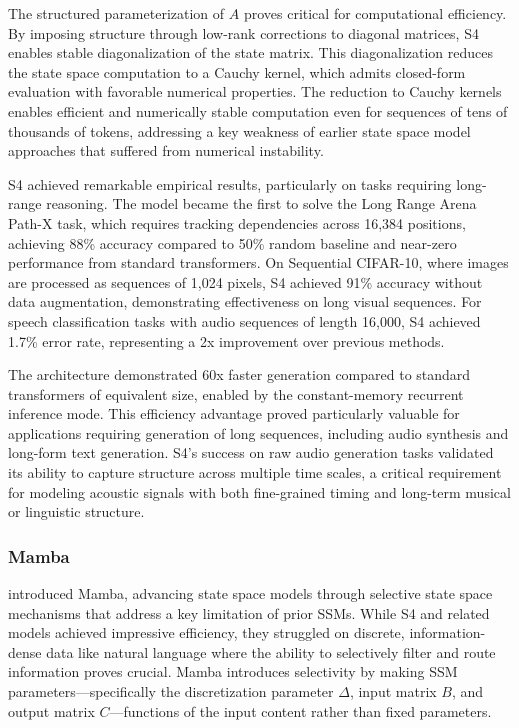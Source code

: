 \documentclass[11pt,letterpaper]{article}
\begin{document}
The structured parameterization of $A$ proves critical for computational efficiency. By imposing structure through low-rank corrections to diagonal matrices, S4 enables stable diagonalization of the state matrix. This diagonalization reduces the state space computation to a Cauchy kernel, which admits closed-form evaluation with favorable numerical properties. The reduction to Cauchy kernels enables efficient and numerically stable computation even for sequences of tens of thousands of tokens, addressing a key weakness of earlier state space model approaches that suffered from numerical instability.

S4 achieved remarkable empirical results, particularly on tasks requiring long-range reasoning. The model became the first to solve the Long Range Arena Path-X task, which requires tracking dependencies across 16,384 positions, achieving 88\% accuracy compared to 50\% random baseline and near-zero performance from standard transformers. On Sequential CIFAR-10, where images are processed as sequences of 1,024 pixels, S4 achieved 91\% accuracy without data augmentation, demonstrating effectiveness on long visual sequences. For speech classification tasks with audio sequences of length 16,000, S4 achieved 1.7\% error rate, representing a 2x improvement over previous methods.

The architecture demonstrated 60x faster generation compared to standard transformers of equivalent size, enabled by the constant-memory recurrent inference mode. This efficiency advantage proved particularly valuable for applications requiring generation of long sequences, including audio synthesis and long-form text generation. S4's success on raw audio generation tasks validated its ability to capture structure across multiple time scales, a critical requirement for modeling acoustic signals with both fine-grained timing and long-term musical or linguistic structure.

\subsubsection{Mamba}

\cite{gu2023mamba} introduced Mamba, advancing state space models through selective state space mechanisms that address a key limitation of prior SSMs. While S4 and related models achieved impressive efficiency, they struggled on discrete, information-dense data like natural language where the ability to selectively filter and route information proves crucial. Mamba introduces selectivity by making SSM parameters—specifically the discretization parameter $\Delta$, input matrix $B$, and output matrix $C$—functions of the input content rather than fixed parameters.
\end{document}
